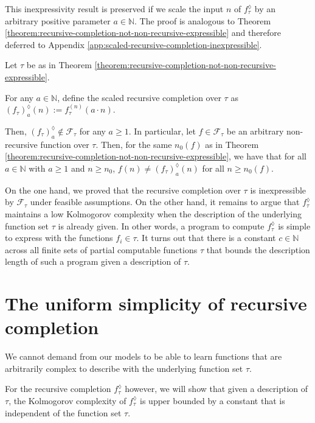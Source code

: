 This inexpressivity result is preserved if we scale the input $n$ of $f_\tau^{\lozenge}$ by an arbitrary positive parameter $a\in\mathbb{N}$. 
The proof is analogous to Theorem \ref{theorem:recursive-completion-not-non-recursive-expressible} and therefore deferred to Appendix \ref{app:scaled-recursive-completion-inexpressible}.
\begin{corollary}
	\label{cor:scaled-recursive-completion-not-non-recursive-expressible-placeholder}
	Let $\tau$ be as in Theorem \ref{theorem:recursive-completion-not-non-recursive-expressible}.
	
	For any $a\in\mathbb{N}$, define the scaled recursive completion over $\tau$ as
	$\left(f_{\tau}\right)_{a}^{\lozenge}(n):=f_{\tau}^{(n)}(a\cdot n)$.
	
	Then, $\left(f_{\tau}\right)_{a}^{\lozenge}\notin \mathcal{F}_{\tau}$ for any $a \geq 1$.
	In particular, let $f\in\mathcal{F}_{\tau}$ be an arbitrary non-recursive function over $\tau$.
	Then, for the same $n_0(f)$ as in Theorem \ref{theorem:recursive-completion-not-non-recursive-expressible}, we have that for all $a\in\mathbb{N}$ with $a\geq 1$ and $n\geq n_0$, $f(n)\neq \left(f_{\tau}\right)_{a}^{\lozenge}(n)$ for all $n\geq n_0(f)$.
\end{corollary}

On the one hand, we proved that the recursive completion over $\tau$ is inexpressible by $\mathcal{F}_{\tau}$ under feasible assumptions.
On the other hand, it remains to argue that $f_\tau^{\lozenge}$ maintains a low Kolmogorov complexity when the description of the underlying function set $\tau$ is already given.
In other words, a program to compute $f_{\tau}^{\lozenge}$ is simple to express with the functions $f_i\in\tau$.
It turns out that there is a constant $c\in\mathbb{N}$ across all finite sets of partial computable functions $\tau$ that bounds the description length of such a program given a description of $\tau$.

\section{The uniform simplicity of recursive completion}
\label{sec:uniform-simplicity-recursive-completion}
We cannot demand from our models to be able to learn functions that are arbitrarily complex to describe with the underlying function set $\tau$.

For the recursive completion $f_{\tau}^{\lozenge}$ however, we will show that given a description of $\tau$, the Kolmogorov complexity of $f_{\tau}^{\lozenge}$ is upper bounded by a constant that is independent of the function set $\tau$.

